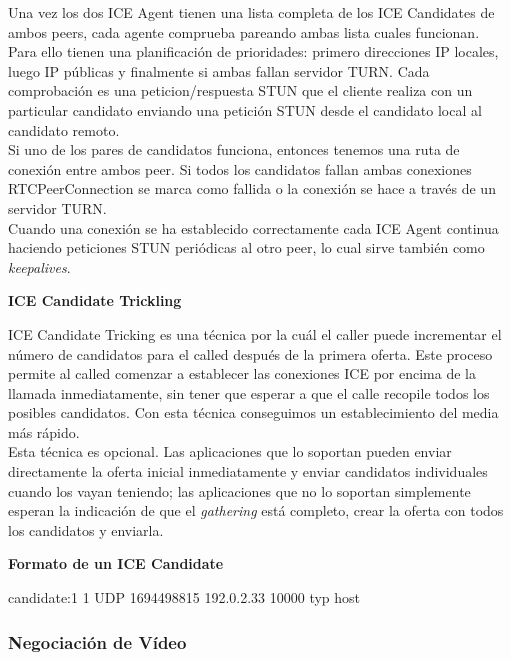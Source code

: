Una vez los dos ICE Agent tienen una lista completa de los ICE Candidates de ambos peers, cada agente comprueba pareando ambas lista cuales funcionan. Para ello tienen una planificación de prioridades: primero direcciones IP locales, luego IP públicas y finalmente si ambas fallan servidor TURN. Cada comprobación es una peticion/respuesta STUN que el cliente realiza con un particular candidato enviando una petición STUN desde el candidato local al candidato remoto.\\

Si uno de los pares de candidatos funciona, entonces tenemos una ruta de conexión entre ambos peer. Si todos los candidatos fallan ambas conexiones RTCPeerConnection se marca como fallida o la conexión se hace a través de un servidor TURN.\\

Cuando una conexión se ha establecido correctamente cada ICE Agent continua haciendo peticiones STUN periódicas al otro peer, lo cual sirve también como \textit{keepalives}.\\

\begin{normalsize}
\textbf{ICE Candidate Trickling}
\end{normalsize}

ICE Candidate Tricking es una técnica por la cuál el caller puede incrementar el número de candidatos para el called después de la primera oferta. Este proceso permite al called comenzar a establecer las conexiones ICE por encima de la llamada inmediatamente, sin tener que esperar a que el calle recopile todos los posibles candidatos. Con esta técnica conseguimos un establecimiento del media más rápido.\\

Esta técnica es opcional. Las aplicaciones que lo soportan pueden enviar directamente la oferta inicial inmediatamente y enviar candidatos individuales cuando los vayan teniendo; las aplicaciones que no lo soportan simplemente esperan la indicación de que el \textit{gathering} está completo, crear la oferta con todos los candidatos y enviarla.\\


\begin{normalsize}
\textbf{Formato de un ICE Candidate}
\end{normalsize}

candidate:1 1 UDP 1694498815 192.0.2.33 10000 typ host


\subsubsection{Negociación de Vídeo}

